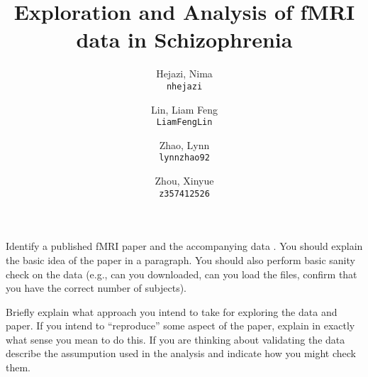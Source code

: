 \documentclass[11pt]{article}
\title{Exploration and Analysis of fMRI data in Schizophrenia}
\author{
  Hejazi, Nima\\
  \texttt{nhejazi}
  \and
  Lin, Liam Feng\\
  \texttt{LiamFengLin}
  \and
  Zhao, Lynn\\
  \texttt{lynnzhao92}
  \and
  Zhou, Xinyue\\
  \texttt{z357412526}
}
\begin{document}
\maketitle

Identify a published fMRI paper and the accompanying data
\cite{lindquist2008statistical}.  You should explain the basic idea of the
paper in a paragraph.  You should also perform basic sanity check on the data
(e.g., can you downloaded, can you load the files, confirm that you have the
correct number of subjects).

Briefly explain what approach you intend to take for exploring
the data and paper.  If you intend to ``reproduce'' some aspect of the paper,
explain in exactly what sense you mean to do this.  If you are thinking about
validating the data describe the assumpution used in the analysis and indicate
how you might check them.


\end{document}
